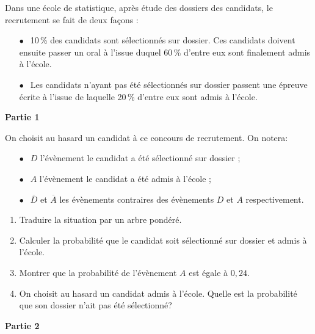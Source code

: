 
\medskip

Dans une école de statistique, après étude des dossiers des candidats, le recrutement se fait de deux façons :

\setlength\parindent{1cm}
\begin{itemize}
\item[$\bullet~~$] 10\,\% des candidats sont sélectionnés sur dossier. Ces candidats doivent ensuite passer un oral à l'issue duquel 60\,\% d'entre eux sont finalement admis à l'école.
\item[$\bullet~~$] Les candidats n'ayant pas été sélectionnés sur dossier passent une épreuve écrite à l'issue de laquelle 20\,\% d'entre eux sont admis à l'école.
\end{itemize}
\setlength\parindent{0cm}

\bigskip

\textbf{Partie 1}

\medskip

On choisit au hasard un candidat à ce concours de recrutement. On notera:

\setlength\parindent{1cm}
\begin{itemize}
\item[$\bullet~~$] $D$ l'évènement \og le candidat a été sélectionné sur dossier \fg{} ;
\item[$\bullet~~$] $A$ l'évènement \og le candidat a été admis à l'école \fg{} ;
\item[$\bullet~~$] $\overline{D}$ et $\overline{A}$ les évènements contraires des évènements $D$ et $A$ respectivement.
\end{itemize}
\setlength\parindent{0cm}

\medskip

\begin{enumerate}
\item Traduire la situation par un arbre pondéré.
\item Calculer la probabilité que le candidat soit sélectionné sur dossier et admis à l'école.
\item Montrer que la probabilité de l'évènement  $A$ est égale à $0,24$.
\item On choisit au hasard un candidat admis à l'école. Quelle est la probabilité que son dossier n'ait pas été sélectionné?
\end{enumerate}

\bigskip

\textbf{Partie 2}

\medskip

